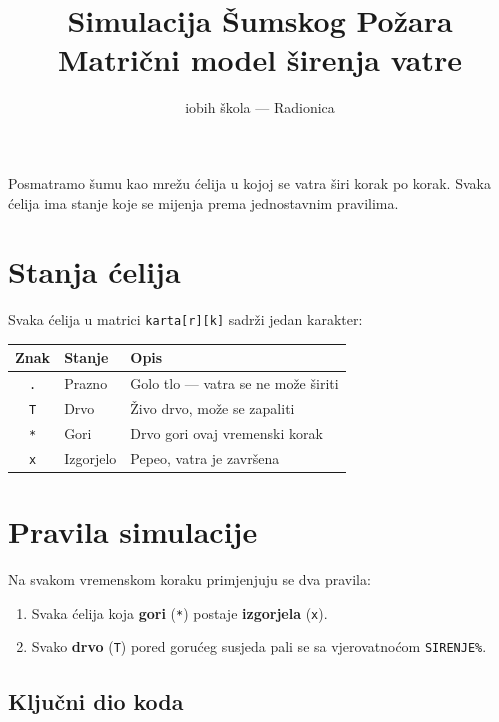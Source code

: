 \documentclass[11pt]{article}
\title{\textbf{Simulacija Šumskog Požara}\\[4pt]
       \large Matrični model širenja vatre}
\author{iobih škola — Radionica}
\date{}
\begin{document}
\maketitle
\thispagestyle{fancy}

Posmatramo šumu kao mrežu ćelija u kojoj se vatra širi korak po korak.
Svaka ćelija ima stanje koje se mijenja prema jednostavnim pravilima.

\section{Stanja ćelija}

Svaka ćelija u matrici \texttt{karta[r][k]} sadrži jedan karakter:

\begin{center}
\begin{tabular}{@{} c l l @{}}
    \toprule
    \textbf{Znak} & \textbf{Stanje} & \textbf{Opis} \\
    \midrule
    \texttt{.} & Prazno     & Golo tlo — vatra se ne može širiti \\
    \texttt{T} & Drvo       & Živo drvo, može se zapaliti \\
    \texttt{*} & Gori       & Drvo gori ovaj vremenski korak \\
    \texttt{x} & Izgorjelo  & Pepeo, vatra je završena \\
    \bottomrule
\end{tabular}
\end{center}

\section{Pravila simulacije}

Na svakom vremenskom koraku primjenjuju se dva pravila:

\begin{enumerate}
    \item Svaka ćelija koja \textbf{gori} (\texttt{*}) postaje \textbf{izgorjela} (\texttt{x}).
    \item Svako \textbf{drvo} (\texttt{T}) pored gorućeg susjeda pali se
          sa vjerovatnoćom \texttt{SIRENJE\%}.
\end{enumerate}

\subsection{Ključni dio koda}
\end{document}
